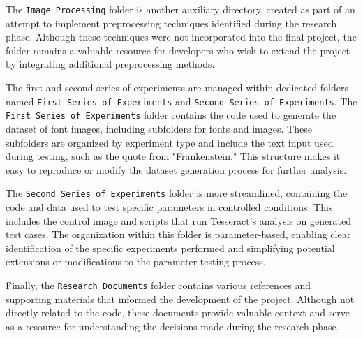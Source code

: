 \documentclass[10pt,twocolumn]{article}
\begin{document}
The \texttt{Image Processing} folder is another auxiliary directory, created as part of an attempt to implement preprocessing techniques identified during the research phase. Although these techniques were not incorporated into the final project, the folder remains a valuable resource for developers who wish to extend the project by integrating additional preprocessing methods.

The first and second series of experiments are managed within dedicated folders named \texttt{First Series of Experiments} and \texttt{Second Series of Experiments}. The \texttt{First Series of Experiments} folder contains the code used to generate the dataset of font images, including subfolders for fonts and images. These subfolders are organized by experiment type and include the text input used during testing, such as the quote from "Frankenstein." This structure makes it easy to reproduce or modify the dataset generation process for further analysis.

The \texttt{Second Series of Experiments} folder is more streamlined, containing the code and data used to test specific parameters in controlled conditions. This includes the control image and scripts that run Tesseract’s analysis on generated test cases. The organization within this folder is parameter-based, enabling clear identification of the specific experiments performed and simplifying potential extensions or modifications to the parameter testing process.

Finally, the \texttt{Research Documents} folder contains various references and supporting materials that informed the development of the project. Although not directly related to the code, these documents provide valuable context and serve as a resource for understanding the decisions made during the research phase.

\printbibliography
\end{document}
